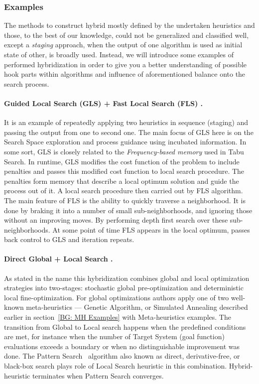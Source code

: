 \subsubsection{Examples}

The methods to construct hybrid mostly defined by the undertaken heuristics and those, to the best of our knowledge, could not be generalized and classified well, except a \textit{staging} approach, when the output of one algorithm is used as initial state of other, is broadly used. Instead, we will introduce some examples of performed hybridization in order to give you a better understanding of possible hook parts within algorithms and influence of aforementioned balance onto the search process.

\paragraph{Guided Local Search (GLS) + Fast Local Search (FLS) \cite{tsang1997fast}.}
It is an example of repeatedly applying two heuristics in sequence (staging) and passing the output from one to second one.
The main focus of GLS here is on the Search Space exploration and process guidance using incubated information. In some sort, GLS is closely related to the \textit{Frequency-based memory} used in Tabu Search. In runtime, GLS modifies the cost function of the problem to include penalties and passes this modified cost function to local search procedure. The penalties form memory that describe a local optimum solution and guide the process out of it. A local search procedure then carried out by FLS algorithm. The main feature of FLS is the ability to quickly traverse a neighborhood. It is done by braking it into a number of small sub-neighborhoods, and ignoring those without an improving moves. By performing depth first search over these sub-neighborhoods. At some point of time FLS appears in the local optimum, passes back control to GLS and iteration repeats. 

\paragraph{Direct Global + Local Search \cite{syrjakow1999efficient}.}
As stated in the name this hybridization combines global and local optimization strategies into two-stages: stochastic global pre-optimization and deterministic local fine-optimization. For global optimizations authors apply one of two well-known meta-heuristics — Genetic Algorithm, or Simulated Annealing described earlier in section~\ref{BG: MH Examples} with Meta-heuristics examples. The transition from Global to Local search happens when the predefined conditions are met, for instance when the number of Target System (goal function) evaluations exceeds a boundary or when no distinguishable improvement was done. The Pattern Search~\cite{hooke1961direct} algorithm also known as direct, derivative-free, or black-box search plays role of Local Search heuristic in this combination. Hybrid-heuristic terminates when Pattern Search converges.

